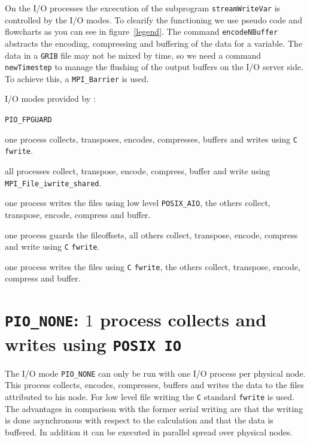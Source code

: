 On the I/O processes 
the excecution of the subprogram {\tt streamWriteVar} is controlled by the I/O 
 modes. To clearify the functioning we use pseudo code and
flowcharts as you can see in figure~\ref{legend}. 
The command 
\texttt{encodeNBuffer} abstracts the encoding, compressing and buffering
of the data for a variable. The data in a 
{\tt GRIB} file may not be mixed by time, so we need a command \texttt{newTimestep} 
to manage the flushing of the output buffers on the I/O server side. To 
achieve this, a \texttt{MPI\_Barrier} is used. 


\bigskip

I/O modes provided by {\pio}:

\bigskip

\hspace*{4mm}\begin{minipage}[]{15cm}
\begin{deflist}{\tt PIO\_FPGUARD\ } 
\item[{\htmlref{\tt PIO\_NONE}{PIONONE}}] 
one process collects, transposes, encodes, compresses, buffers and writes using 
{\tt C} {\tt fwrite}.
\item[{\htmlref{\tt PIO\_MPI}{PIOMPI}}] 
all processes collect, transpose, encode, compress, buffer and write using 
{\tt MPI\_File\_iwrite\_shared}.
\item[{\htmlref{\tt PIO\_ASYNCH}{PIOASYNCH}}]
one process writes the files using low level 
{\tt POSIX\_AIO}, the others collect, transpose, encode, compress and buffer.
\item[{\htmlref{\tt PIO\_FPGUARD}{PIOFPGUARD}}]
one process guards the fileoffsets, all others 
collect, transpose, encode, compress and write using {\tt C} {\tt fwrite}.
\item[{\htmlref{\tt PIO\_WRITER}{PIOWRITER}}]
one process writes the files using {\tt C} {\tt fwrite}, 
the others collect, transpose, encode, compress and buffer.
\end{deflist}
\end{minipage}


\section{{\tt PIO\_NONE}: $1$ process collects and writes using {\tt POSIX IO}}
\label{PIONONE}

The I/O mode {\tt PIO\_NONE} can only be run with one I/O process per physical 
node. This 
process collects, encodes, compresses, buffers and writes the data to the files 
attributed 
to his node. For low level file writing the {\tt C} standard \texttt{fwrite} 
is used. The advantages 
in comparison with the former serial writing are that the writing is done 
asynchronous with respect to the calculation and that the data is buffered. In 
addition it can be executed in parallel spread over physical nodes.

